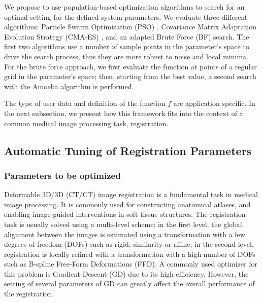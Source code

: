 \documentclass[]{spie}  %
\begin{document}
We propose to use population-based optimization algorithms to search for an optimal setting for the defined system parameters. We evaluate three different algorithms: Particle Swarm Optimization (PSO) \cite{Kennedy95:NN}, Covariance Matrix Adaptation Evolution Strategy (CMA-ES) \cite{Hansen06}, and an adapted Brute Force (BF) search. The first two algorithms use a number of sample points in the parameter's space to drive the search process, thus they are more robust to noise and local minima. For the brute force approach, we first evaluate the function at points of a regular grid  in the parameter's space; then, starting from the best value, a second search with the Amoeba algorithm is performed.

The type of user data and definition of the function $f$ are application specific. In the next subsection, we present how this framework fits into the context of a common medical image processing task, registration.

\subsection{Automatic Tuning of Registration Parameters}

\subsubsection{Parameters to be optimized}

Deformable 3D/3D (CT/CT) image registration is a fundamental task in medical image processing. It is commonly used for constructing anatomical atlases, and enabling image-guided interventions in soft tissue structures. The registration task is usually solved using a multi-level scheme: in the first level, the global alignment between the images is estimated using a transformation with a few degrees-of-freedom (DOFs) such as rigid, similarity or affine; in the second level, registration is locally refined with a transformation with a high number of DOFs such as B-spline Free-Form Deformations (FFD). A commonly used optimizer for this problem is Gradient-Descent (GD) due to its high efficiency. However, the setting of several parameters of GD can greatly affect the overall performance of the registration. 
\end{document}
